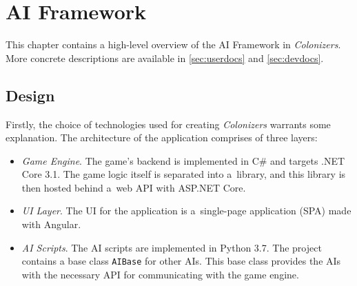 \chapter{AI Framework}

This chapter contains a high-level overview of the AI Framework in \emph{Colonizers}.
More concrete descriptions are available in \autoref{sec:userdocs} and \autoref{sec:devdocs}.

\section{Design}

Firstly, the choice of technologies used for creating \emph{Colonizers}
warrants some explanation. The architecture of the application comprises of three layers:
\begin{itemize}
    \item \emph{Game Engine}. The game's backend is implemented in C\# and targets
        .NET Core 3.1. The game logic itself is separated into a~library,
        and this library is then hosted behind a~web API with ASP.NET Core.
    \item \emph{UI Layer}. The UI for the application is a~single-page application
        (SPA) made with Angular.
    \item \emph{AI Scripts}. The AI scripts are implemented in Python 3.7. The project
        contains a base class \texttt{AIBase} for other AIs. This base class provides
        the AIs with the necessary API for communicating with the game engine.
\end{itemize}


